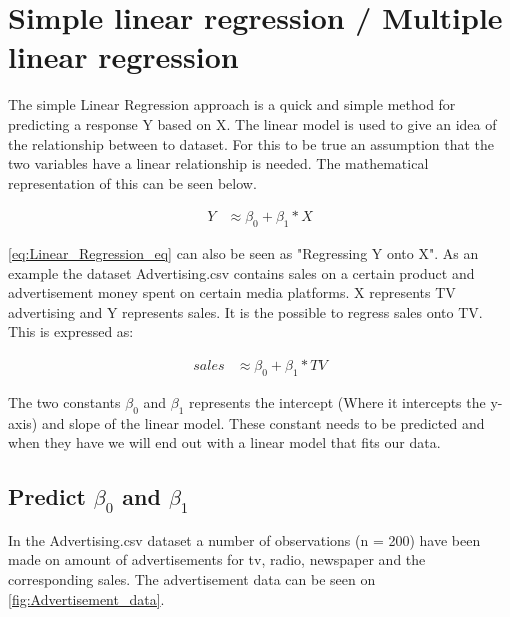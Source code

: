 \graphicspath{{Chapters/Indledning/}}

\chapter{Simple linear regression / Multiple linear regression}

The simple Linear Regression approach is a quick and simple method for predicting a response Y based on X. The linear model is used to give an idea of the relationship between to dataset. For this to be true an assumption that the two variables have a linear relationship is needed. The mathematical representation of this can be seen below.

\begin{equation} \label{eq:Linear_Regression_eq}
	\begin{split}
		Y & \approx \beta_0 + \beta_1 * X
	\end{split}
\end{equation} 

\cref{eq:Linear_Regression_eq} can also be seen as "Regressing Y onto X". As an example the dataset Advertising.csv contains sales on a certain product and advertisement money spent on certain media platforms. X represents TV advertising and Y represents sales. It is the possible to regress sales onto TV. This is expressed as:

\begin{equation} \label{eq:Linear_Regression_eq_sales}
\begin{split}
sales & \approx \beta_0 + \beta_1 * TV
\end{split}
\end{equation} 


The two constants $\beta_0$ and $\beta_1$ represents the intercept (Where it intercepts the y-axis) and slope of the linear model. These constant needs to be predicted and when they have we will end out with a linear model that fits our data.

\section{Predict $\beta_0$ and $\beta_1$}
In the Advertising.csv dataset a number of observations (n = 200) have been made on amount of advertisements for tv, radio, newspaper and the corresponding sales. The advertisement data can be seen on \cref{fig:Advertisement_data}.

